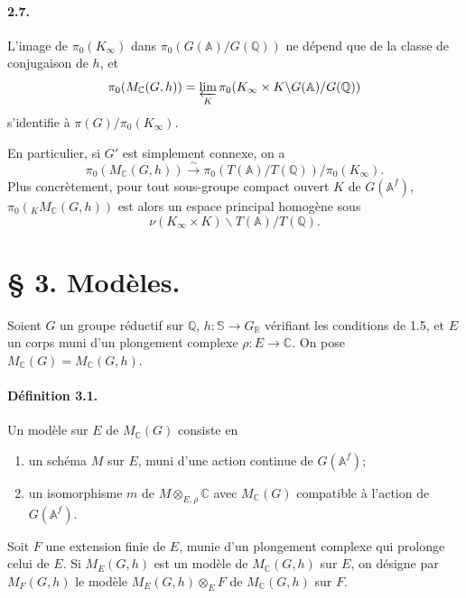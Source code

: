 \documentclass[10pt]{article}
\newcommand{\A}{\mathbb A}
\newcommand{\Af}{\mathbb A^f}
\newcommand{\C}{\mathbb C}
\newcommand{\Q}{\mathbb Q}
\newcommand{\R}{\mathbb R}
\newcommand{\bS}{\mathbb S}
\newcommand{\limproj}{\varprojlim}
\newcommand{\MC}{M_{\C}}
\begin{document}
\paragraph{2.7.} L'image de $\pi_0(K_\infty)$ dans $\pi_0(G(\A)/G(\Q))$ ne dépend que de la classe de conjugaison de $h$, et
\[
\pi_0(\MC(G,h))=\limproj_K\pi_0(K_\infty\times K\backslash G(\A)/G(\Q))
\]
s'identifie à $\pi(G)/\pi_0(K_\infty)$.

En particulier, si $G'$ est simplement connexe, on a
\[
\pi_0(\MC(G,h))\xrightarrow{\sim}\pi_0(T(\A)/T(\Q))/\pi_0(K_\infty). \tag{2.7.1}
\]
Plus concrètement, pour tout sous-groupe compact ouvert $K$ de $G(\Af)$, $\pi_0({}_K\MC(G,h))$ est alors un espace principal homogène sous
\[
\nu(K_\infty\times K)\backslash T(\A)/T(\Q).
\]

\section*{§ 3. Modèles.}

Soient $G$ un groupe réductif sur $\Q$, $h:\bS\to G_\R$ vérifiant les conditions de 1.5, et $E$ un corps muni d'un plongement complexe $\rho:E\to\C$. On pose $\MC(G)=\MC(G,h)$.

\paragraph{Définition 3.1.} Un modèle sur $E$ de $\MC(G)$ consiste en
\begin{enumerate}[label=(\alph*),leftmargin=2.4em]
\item un schéma $M$ sur $E$, muni d'une action continue de $G(\Af)$;
\item un isomorphisme $m$ de $M\otimes_{E,\rho}\C$ avec $\MC(G)$ compatible à l'action de $G(\Af)$.
\end{enumerate}
Soit $F$ une extension finie de $E$, munie d'un plongement complexe qui prolonge celui de $E$. Si $M_E(G,h)$ est un modèle de $\MC(G,h)$ sur $E$, on désigne par $M_F(G,h)$ le modèle $M_E(G,h)\otimes_E F$ de $\MC(G,h)$ sur $F$.
\end{document}

